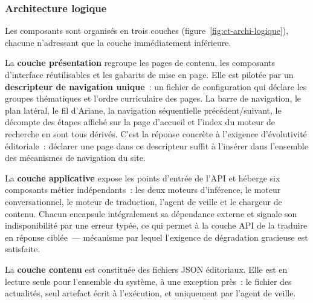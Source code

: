 \subsubsection{Architecture logique}

Les composants sont organisés en trois couches (figure~\ref{fig:ct-archi-logique}),
chacune n'adressant que la couche immédiatement inférieure.

La \textbf{couche présentation} regroupe les pages de contenu, les composants
d'interface réutilisables et les gabarits de mise en page. Elle est pilotée par un
\textbf{descripteur de navigation unique}~: un fichier de configuration qui déclare
les groupes thématiques et l'ordre curriculaire des pages. La barre de navigation, le
plan latéral, le fil d'Ariane, la navigation séquentielle \og{}précédent/suivant\fg{},
le décompte des étapes affiché sur la page d'accueil et l'index du moteur de recherche
en sont tous dérivés. C'est la réponse concrète à l'exigence d'évolutivité éditoriale~:
déclarer une page dans ce descripteur suffit à l'insérer dans l'ensemble des
mécanismes de navigation du site.

La \textbf{couche applicative} expose les points d'entrée de l'API et héberge six
composants métier indépendants~: les deux moteurs d'inférence, le moteur
conversationnel, le moteur de traduction, l'agent de veille et le chargeur de contenu.
Chacun encapsule intégralement sa dépendance externe et signale son indisponibilité
par une erreur typée, ce qui permet à la couche API de la traduire en réponse
 ciblée~--- mécanisme par lequel l'exigence de dégradation gracieuse est
satisfaite.

La \textbf{couche contenu} est constituée des fichiers JSON éditoriaux. Elle est en
lecture seule pour l'ensemble du système, à une exception près~: le fichier des
actualités, seul artefact écrit à l'exécution, et uniquement par l'agent de veille.

